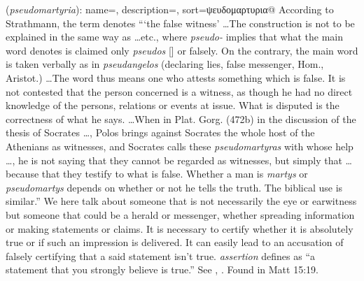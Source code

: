 \item[False assertion,]

(\textit{pseudomartyria}):
{
    name=,
    description={},
    sort=ψευδομαρτυρια@
}
According to Strathmann, the term denotes ```the false witness' \ldots The construction is not to be explained in the same way as \ldots etc., where \emph{pseudo-} implies that what the main word denotes is claimed only \emph{pseudos} [] or falsely.  On the contrary, the main word is taken verbally as in \emph{pseudangelos} (declaring lies, false messenger, Hom., Aristot.) \ldots The word thus means one who attests something which is false. It is not contested that the person concerned is a witness, as though he had no direct knowledge of the persons, relations or events at issue. What is disputed is the correctness of what he says. \ldots When in Plat. Gorg. (472b) in the discussion of the thesis of Socrates \ldots, Polos brings against Socrates the whole host of the Athenians as witnesses, and Socrates calls these \emph{pseudomartyras} with whose help \ldots, he is not saying that they cannot be regarded as witnesses, but simply that \ldots because that they testify to what is false. Whether a man is \emph{martys} or \emph{pseudomartys} depends on whether or not he tells the truth. The biblical use is similar.''
We here talk about someone that is not necessarily the eye or earwitness but someone that could be a herald or messenger, whether spreading information or making statements or claims. It is necessary to certify whether it is absolutely true or if such an impression is delivered. It can easily lead to an accusation of falsely certifying that a said statement isn't true. \emph{assertion} defines as ``a statement that you strongly believe is true.'' See , .
Found in Matt 15:19.
